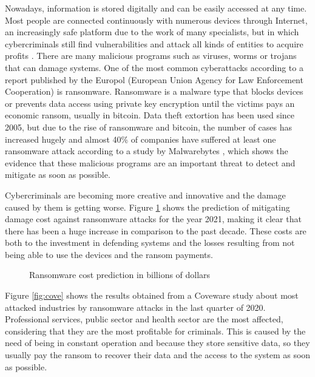 \noindent Nowadays, information is stored digitally and can be easily accessed at any time. Most people are connected continuously with numerous devices through Internet, an increasingly safe platform due to the work of many specialists, but in which cybercriminals still find vulnerabilities and attack all kinds of entities to acquire profits \cite{STDWNCRY}. There are many malicious programs such as viruses, worms or trojans that can damage systems. One of the most common cyberattacks according to a report published by the Europol (European Union Agency for Law Enforcement Cooperation) \cite{ZETTER} is ransomware. Ransomware is a malware type that blocks devices or prevents data access using private key encryption until the victims pays an economic ransom, usually in bitcoin. Data theft extortion has been used since 2005, but due to the rise of ransomware and bitcoin, the number of cases has increased hugely and almost 40\% of companies have suffered at least one ransomware attack according to a study by Malwarebytes \cite{2}, which shows the evidence that these malicious programs are an important threat to detect and mitigate as soon as possible.

Cybercriminals are becoming more creative and innovative and the damage caused by them is getting worse. Figure \ref{fig:im0} shows the prediction of mitigating damage cost against ransomware attacks for the year 2021, making it clear that there has been a huge increase in comparison to the past decade. These costs are both to the investment in defending systems and the losses resulting from not being able to use the devices and the ransom payments.

\begin{figure}[h!]
\begin{center}
{}
\end{center}
\caption{Ransomware cost prediction in billions of dollars}
\label{fig:im0}
\end{figure}

Figure \ref{fig:cove} shows the results obtained from a Coveware study \cite{4} about most attacked industries by ransomware attacks in the last quarter of 2020. Professional services, public sector and health sector are the most affected, considering that they are the most profitable for criminals. This is caused by the need of being in constant operation and because they store sensitive data, so they usually pay the ransom to recover their data and the access to the system as soon as possible.

